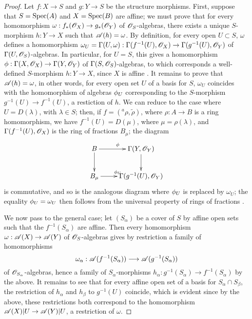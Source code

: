 \begin{proof}
Let $f:X\to S$ and $g:Y\to S$ be the structure morphisms.
First, suppose that $S=\operatorname{Spec}(A)$ and $X=\operatorname{Spec}(B)$ are affine; we must prove that for every homomorphism $\omega:f_*(\sh{O}_X)\to g_*(\sh{O}_Y)$ of $\mathscr{O}_S$-algebras, there exists a unique $S$-morphism $h:Y\to X$ such that $\mathscr{A}(h)=\omega$.
By definition, for every open $U\subset S$, $\omega$ defines a homomorphism $\omega_U=\Gamma(U,\omega):\Gamma(f^{-1}(U),\sh{O}_X)\to\Gamma(g^{-1}(U),\sh{O}_Y)$ of $\Gamma(U,\mathscr{O}_S)$-algebras.
In particular, for $U=S$, this gives a homomorphism $\vphi:\Gamma(X,\sh{O}_X)\to\Gamma(Y,\sh{O}_Y)$ of $\Gamma(S,\mathscr{O}_S)$-algebras, to which corresponds a well-defined $S$-morphism $h:Y\to X$, since $X$ is affine .
It remains to prove that $\mathscr{A}(h)=\omega$, in other words, for every open set $U$ of a basis for $S$, $\omega_U$ coincides with the homomorphism of algebras $\phi_U$ corresponding to the $S$-morphism $g^{-1}(U)\to f^{-1}(U)$, a restiction of $h$.
We can reduce to the case where $U=D(\lambda)$, with $\lambda\in S$; then, if $f=({}^a\rho,\widetilde{\rho})$, where $\rho:A\to B$ is a ring homomorphism, we have $f^{-1}(U)=D(\mu)$, where $\mu=\rho(\lambda)$, and $\Gamma(f^{-1}(U),\mathscr{O}_X)$ is the ring of fractions $B_\mu$; the diagram
\[
  \xymatrix{
    B\ar[r]^\vphi\ar[d] &
    \Gamma(Y,\sh{O}_Y)\ar[d]\\
    B_\mu\ar[r]^{\vphi_U} &
    \Gamma(g^{-1}(U),\sh{O}_Y)
  }
\]
is commutative, and so is the analogous diagram where $\phi_U$ is replaced by $\omega_U$; the equality $\phi_U=\omega_U$ then follows from the universal property of rings of fractions .

We now pass to the general case; let $(S_\alpha)$ be a cover of $S$ by affine open sets
such that the $f^{-1}(S_\alpha)$ are affine.
Then every homomorphism $\omega:\sh{A}(X)\to\sh{A}(Y)$ of $\mathscr{O}_S$-algebras gives by restriction a family of homomorphisms
\[
  \omega_\alpha:\sh{A}(f^{-1}(S_\alpha))\to\sh{A}(g^{-1}(S_\alpha))
\]
of $\mathscr{O}_{S_\alpha}$-algebras, hence a family of $S_\alpha$-morphisms $h_\alpha:g^{-1}(S_\alpha)\to f^{-1}(S_\alpha)$ by the above.
It remains to see that for every affine open set of a basis for $S_\alpha\cap S_\beta$, the restriction of $h_\alpha$ and $h_\beta$ to $g^{-1}(U)$ coincide, which is evident since by the above, these restrictions both correspond to the homomorphism $\sh{A}(X)|U\to\sh{A}(Y)|U$, a restriction of $\omega$.
\end{proof}

